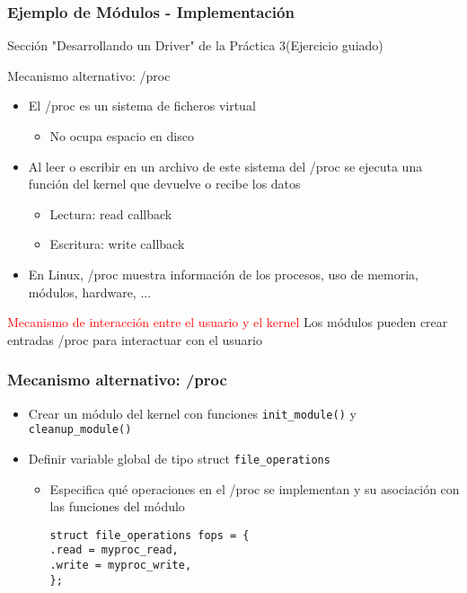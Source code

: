 \begin{frame}[fragile]
\frametitle{Ejemplo de Módulos - Implementación}
     Sección "Desarrollando un Driver" de la Práctica 3(Ejercicio guiado) 
\end{frame}


\begin{frame}{Mecanismo alternativo: /proc}
  \begin{itemize}
       \item El /proc es un sistema de ficheros virtual
        \begin{itemize}
            \item No ocupa espacio en disco
          \end{itemize}
        \item Al leer o escribir en un archivo  de este sistema del /proc se ejecuta una función del kernel que devuelve o recibe los datos
         \begin{itemize}
            \item Lectura: read callback
            \item Escritura: write callback
         \end{itemize}
        \item En Linux, /proc muestra información de los procesos, uso de memoria, módulos, hardware, ... 
   \end{itemize}
    \begin{block}{\textcolor{red}{Mecanismo de interacción entre el usuario y el kernel}}
           Los módulos pueden crear entradas /proc para interactuar con el usuario
       \end{block}  
\end{frame}




\begin{frame}[fragile]
\frametitle{Mecanismo alternativo: /proc}
  \begin{itemize}
         \item Crear un módulo del kernel con funciones \texttt{init\_module()} y \texttt{cleanup\_module()} 
         \item Definir variable global de tipo struct \texttt{file\_operations}
  \begin{itemize}
          \item Especifica qué operaciones en el /proc se implementan y su asociación con las funciones del módulo
\begin{lstlisting}
struct file_operations fops = {
.read = myproc_read,
.write = myproc_write,
};
\end{lstlisting}
  \end{itemize}	
  \end{itemize}
\end{frame}



